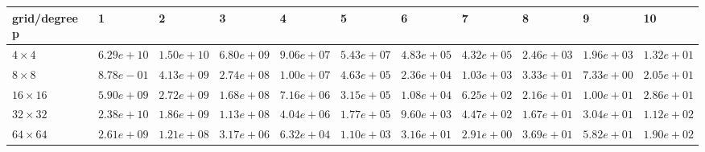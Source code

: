 \begin{tabular}{lllllllllll}
\hline
 grid/degree p   & 1          & 2          & 3          & 4          & 5          & 6          & 7          & 8          & 9          & 10         \\
\hline
 $4 \times 4$    & $6.29e+10$ & $1.50e+10$ & $6.80e+09$ & $9.06e+07$ & $5.43e+07$ & $4.83e+05$ & $4.32e+05$ & $2.46e+03$ & $1.96e+03$ & $1.32e+01$ \\
 $8 \times 8$    & $8.78e-01$ & $4.13e+09$ & $2.74e+08$ & $1.00e+07$ & $4.63e+05$ & $2.36e+04$ & $1.03e+03$ & $3.33e+01$ & $7.33e+00$ & $2.05e+01$ \\
 $16 \times 16$  & $5.90e+09$ & $2.72e+09$ & $1.68e+08$ & $7.16e+06$ & $3.15e+05$ & $1.08e+04$ & $6.25e+02$ & $2.16e+01$ & $1.00e+01$ & $2.86e+01$ \\
 $32 \times 32$  & $2.38e+10$ & $1.86e+09$ & $1.13e+08$ & $4.04e+06$ & $1.77e+05$ & $9.60e+03$ & $4.47e+02$ & $1.67e+01$ & $3.04e+01$ & $1.12e+02$ \\
 $64 \times 64$  & $2.61e+09$ & $1.21e+08$ & $3.17e+06$ & $6.32e+04$ & $1.10e+03$ & $3.16e+01$ & $2.91e+00$ & $3.69e+01$ & $5.82e+01$ & $1.90e+02$ \\
\hline
\end{tabular}
